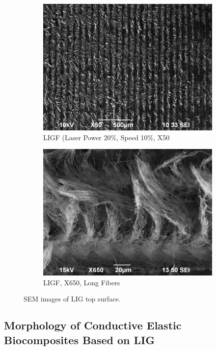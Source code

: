 \begin{figure}[H]
\begin{subfigure}{0.49\textwidth}
  \includegraphics[width=\linewidth]{Figures/Results/SEM/LIGF_1.jpg}
  \caption{LIGF (Laser Power 20$\%$, Speed 10$\%$, X50}
  \label{fig:SEM4}
\end{subfigure}\hfil %
\begin{subfigure}{0.49\textwidth}
  \includegraphics[width=\linewidth]{Figures/Results/SEM/LIG_ID4x650_HANA.jpg}
  \caption{LIGF, X650, Long Fibers \cite{hana}}
  \label{fig:SEM5}
\end{subfigure}\hfil
\caption{SEM images of LIG top surface.}
\label{fig:LIGs-SEMs}
\end{figure}


\subsection{Morphology of Conductive Elastic Biocomposites Based on LIG}

